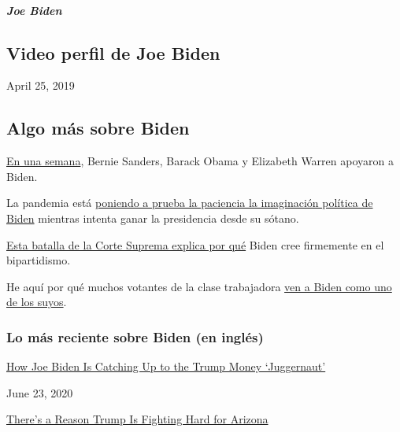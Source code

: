 \hypertarget{joe-biden-1}{%
\subparagraph{Joe Biden}\label{joe-biden-1}}

\hypertarget{video-perfil-de-joe-biden}{%
\subsection{Video perfil de Joe Biden}\label{video-perfil-de-joe-biden}}

April 25, 2019

\hypertarget{algo-muxe1s-sobre-biden}{%
\subsection{Algo más sobre Biden}\label{algo-muxe1s-sobre-biden}}

\href{https://www.nytimes3xbfgragh.onion/2020/04/15/us/politics/elizabeth-warren-endorse-biden.html?action=click\&module=RelatedLinks\&pgtype=Article}{En
una semana}, Bernie Sanders, Barack Obama y Elizabeth Warren apoyaron a
Biden.

La pandemia está
\href{https://www.nytimes3xbfgragh.onion/2020/04/25/us/politics/joe-biden-coronavirus-quarantine.html}{poniendo
a prueba la paciencia la imaginación política de Biden} mientras intenta
ganar la presidencia desde su sótano.

\href{https://www.nytimes3xbfgragh.onion/2019/09/07/us/politics/joe-biden-bork-supreme-court.html}{Esta
batalla de la Corte Suprema explica por qué} Biden cree firmemente en el
bipartidismo.

He aquí por qué muchos votantes de la clase trabajadora
\href{https://www.nytimes3xbfgragh.onion/2019/11/19/us/politics/joe-biden-working-class.html}{ven
a Biden como uno de los suyos}.

\hypertarget{lo-muxe1s-reciente-sobre-biden-en-ingluxe9s}{%
\subsubsection{Lo más reciente sobre Biden (en
inglés)}\label{lo-muxe1s-reciente-sobre-biden-en-ingluxe9s}}

\href{https://www.nytimes3xbfgragh.onion/2020/06/23/us/politics/biden-trump-2020-fundraising.html}{How
Joe Biden Is Catching Up to the Trump Money `Juggernaut'}

June 23, 2020

\href{https://www.nytimes3xbfgragh.onion/2020/06/23/us/politics/arizona-2020-election-democrats-republicans.html}{There's
a Reason Trump Is Fighting Hard for Arizona}

